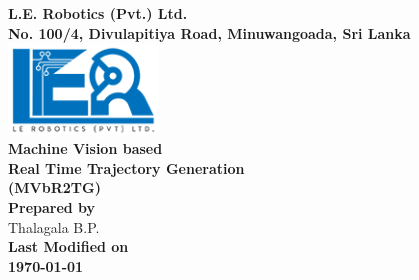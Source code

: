 \begin{titlepage}
\center %

\textbf{\Large L.E. Robotics (Pvt.) Ltd.}\\[0.5cm]
\textbf{\large No. 100/4, Divulapitiya Road, Minuwangoada,	Sri Lanka}\\[2cm]

\includegraphics[width=0.3\textwidth]{figures/logoler}\\[2cm]

	
\textbf{\Huge Machine Vision based\\ Real Time Trajectory Generation\\ (MVbR2TG)}\\[6cm]



\vfill
\textbf{\large Prepared by}\\[0.5cm]
{\large Thalagala B.P.}\\[1cm]

\textbf{\large Last Modified on}\\[0.5cm]
\textbf{\Large \today} %



\end{titlepage}